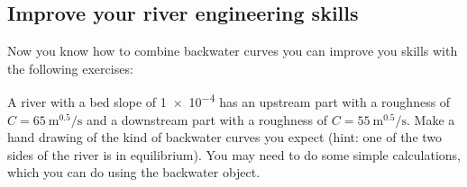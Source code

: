 \documentclass[a4paper]{article}
\begin{document}
\subsection{Improve your river engineering skills}
Now you know how to combine backwater curves you can improve you skills with the following exercises:

\begin{exercise}
  A river with a bed slope of \num{1e-4} has an upstream part with a roughness of $C=\SI{65}{\m\tothe{0.5}\per\s}$ and a downstream part with a roughness of $C=\SI{55}{\m\tothe{0.5}\per\s}$. Make a hand drawing of the kind of backwater curves you expect (hint: one of the two sides of the river is in equilibrium). You may need to do some simple calculations, which you can do using the backwater object.
\end{exercise}
\end{document}
